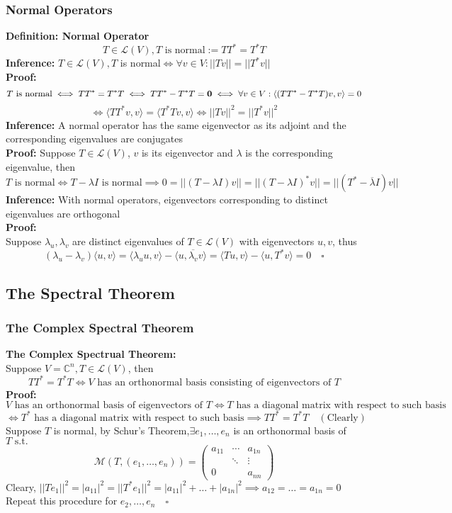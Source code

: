 \documentclass{article}
\newcommand{\st}{\mbox{ s.t. }}
\newcommand{\0}{{\bf{0}}}
\begin{document}
\subsubsection{Normal Operators}
\textbf{Definition: Normal Operator}
$$T\in\mathcal{L}(V),T\mbox{ is normal}:=TT^*=T^*T$$
\textbf{Inference:} $T\in\mathcal{L}(V),T$ is normal$\iff\forall v\in V:||Tv||=||T^*v||$\\
\textbf{Proof:}
$$T\mbox{ is normal}\iff TT^*=T^*T\iff TT^*-T^*T=\0\iff\forall v\in V:\langle (TT^*-T^*T)v,v\rangle=0$$
$$\iff\langle TT^*v,v\rangle=\langle T^*Tv,v\rangle\iff||Tv||^2=||T^*v||^2$$
\textbf{Inference:} A normal operator has the same eigenvector as its adjoint and the corresponding eigenvalues are conjugates\\
\textbf{Proof:}
Suppose $T\in\mathcal{L}(V)$, $v$ is its eigenvector and $\lambda$ is the corresponding eigenvalue, then
$$T\mbox{ is normal}\iff T-\lambda I\mbox{ is normal}\implies0=||(T-\lambda I)v||=||(T-\lambda I)^*v||=||(T^*-\overline{\lambda}I)v||$$
\textbf{Inference:} With normal operators, eigenvectors corresponding to distinct eigenvalues are orthogonal\\
\textbf{Proof:}\\
Suppose $\lambda_u,\lambda_v$ are distinct eigenvalues of $T\in\mathcal{L}(V)$ with eigenvectors $u,v$, thus
$$(\lambda_u-\lambda_v)\langle u,v\rangle=\langle \lambda_u u,v\rangle-\langle u,\overline{\lambda_v}v\rangle=\langle Tu,v\rangle-\langle u,T^*v\rangle=0\quad\square$$
\subsection{The Spectral Theorem}
\subsubsection{The Complex Spectral Theorem}
\textbf{The Complex Spectrual Theorem:}\\
Suppose $V=\mathbb{C}^n,T\in\mathcal{L}(V)$, then
$$TT^*=T^*T\iff V\mbox{ has an orthonormal basis consisting of eigenvectors of }T$$
\textbf{Proof:}
$$V\mbox{ has an orthonormal basis of eigenvectors of }T\iff T\mbox{ has a diagonal matrix with respect to such basis}$$
$$\iff T^*\mbox{ has a diagonal matrix with respect to such basis}\implies TT^*=T^*T\quad(\mbox{Clearly})$$
Suppose $T$ is normal, by Schur's Theorem,$\exists e_1,\dots,e_n$ is an orthonormal basis of $T\st$
$$\mathcal{M}(T,(e_1,\dots,e_n))=\begin{pmatrix}
    a_{11}&\cdots&a_{1n}\\
    &\ddots&\vdots\\
    0&&a_{nn}
\end{pmatrix}$$
Cleary, $||Te_1||^2=|a_{11}|^2=||T^*e_1||^2=|a_{11}|^2+\dots+|a_{1n}|^2\implies a_{12}=\dots=a_{1n}=0$\\
Repeat this procedure for $e_2,\dots,e_n\quad\square$
\end{document}
